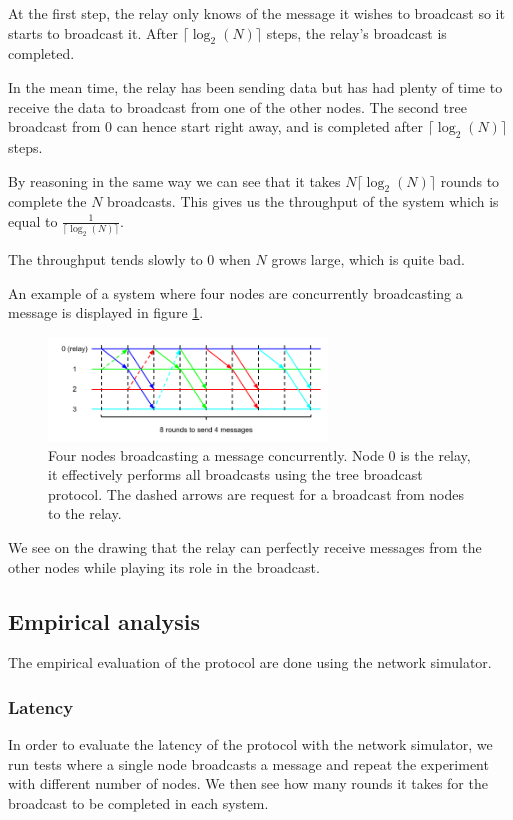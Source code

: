 \documentclass[a4paper]{article}
\begin{document}
At the first step, the relay only knows of the message it wishes to broadcast
so it starts to broadcast it. After $\lceil\log_2(N)\rceil$ steps, the relay's
broadcast is completed.

In the mean time, the relay has been sending data but has had plenty of time
to receive the data to broadcast from one of the other nodes. The second tree
broadcast from $0$ can hence start right away, and is completed after
$\lceil\log_2(N)\rceil$ steps.

By reasoning in the same way we can see that it takes $N \lceil\log_2(N)\rceil$
rounds to complete the $N$ broadcasts. This gives us the throughput of the
system which is equal to $\frac{1}{\lceil\log_2(N)\rceil}$.

The throughput tends slowly to $0$ when $N$ grows large, which is quite bad.

An example of a system where four nodes are concurrently broadcasting a message
is displayed in figure \ref{figure:throughput}.

\begin{figure}[h]
    \centering
    \includegraphics[width=280px]{Throughput.png}
    \caption{Four nodes broadcasting a message concurrently. Node 0 is the relay, it effectively performs all broadcasts using the tree broadcast protocol. The dashed arrows are request for a broadcast from nodes to the relay.}
    \label{figure:throughput}
\end{figure}

We see on the drawing that the relay can perfectly receive messages from the
other nodes while playing its role in the broadcast.

\subsection{Empirical analysis}
The empirical evaluation of the protocol are done using the network simulator.

\subsubsection{Latency}
In order to evaluate the latency of the protocol with the network simulator,
we run tests where a single node broadcasts a message and repeat the experiment
with different number of nodes. We then see how many rounds it takes for the
broadcast to be completed in each system.
\end{document}
